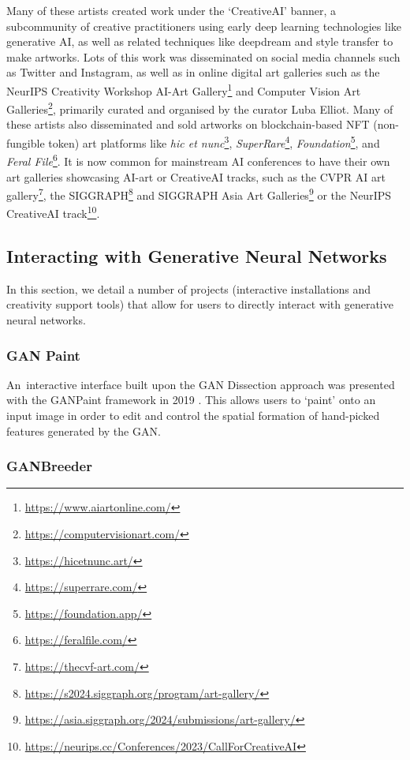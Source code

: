 Many of these artists created work under the `CreativeAI' banner, a subcommunity of creative practitioners using early deep learning technologies like generative AI, as well as related techniques like deepdream and style transfer \citep{gatys2016neural} to make artworks. 
Lots of this work was disseminated on social media channels such as Twitter and Instagram, as well as in online digital art galleries such as the NeurIPS Creativity Workshop AI-Art Gallery\footnote{\url{https://www.aiartonline.com/}} and Computer Vision Art Galleries\footnote{\url{https://computervisionart.com/}}, primarily curated and organised by the curator Luba Elliot. 
Many of these artists also disseminated and sold artworks on blockchain-based NFT (non-fungible token) art platforms like \textit{hic et nunc}\footnote{\url{https://hicetnunc.art/}}, \textit{SuperRare}\footnote{\url{https://superrare.com/}}, \textit{Foundation}\footnote{\url{https://foundation.app/}}, and \textit{Feral File}\footnote{\url{https://feralfile.com/}}. 
It is now common for mainstream AI conferences to have their own art galleries showcasing AI-art or CreativeAI tracks, such as the CVPR AI art gallery\footnote{\url{https://thecvf-art.com/}}, the SIGGRAPH\footnote{\url{https://s2024.siggraph.org/program/art-gallery/}} and SIGGRAPH Asia Art Galleries\footnote{\url{https://asia.siggraph.org/2024/submissions/art-gallery/}} or the NeurIPS CreativeAI track\footnote{\url{https://neurips.cc/Conferences/2023/CallForCreativeAI}}.

\subsection{Interacting with Generative Neural Networks} 

In this section, we detail a number of projects (interactive installations and creativity support tools) that allow for users to directly interact with generative neural networks.

\subsubsection{GAN Paint}

An~interactive interface built upon the GAN Dissection approach \citep{Bau2018-td} was presented with the GANPaint framework in 2019 \citep{bau2019semantic}. 
This allows users to `paint' onto an input image in order to edit and control the spatial formation of hand-picked features generated by the GAN. 

\subsubsection{GANBreeder}

